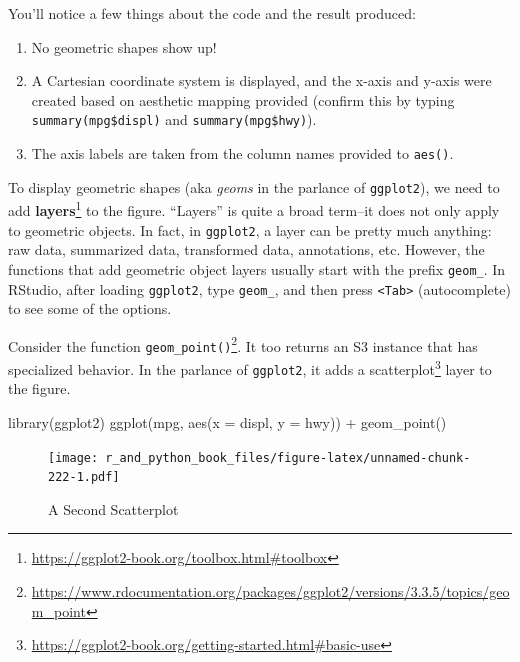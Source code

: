 \documentclass[
  12pt,
  krantz2]{krantz}
\makeatletter
\newenvironment{Shaded}{\begin{snugshade}}{\end{snugshade}}
\newcommand{\AttributeTok}[1]{\textcolor[rgb]{0.61,0.61,0.61}{#1}}
\newcommand{\FunctionTok}[1]{\textcolor[rgb]{0,0,0}{#1}}
\newcommand{\NormalTok}[1]{#1}
\newcommand{\SpecialCharTok}[1]{\textcolor[rgb]{0,0,0}{#1}}
\renewcommand{\href}[2]{#2\footnote{\url{#1}}}
\newenvironment{kframe}{%
\medskip{}
\setlength{\fboxsep}{.8em}
 \def\at@end@of@kframe{}%
 \ifinner\ifhmode%
  \def\at@end@of@kframe{\end{minipage}}%
  \begin{minipage}{\columnwidth}%
 \fi\fi%
 \def\FrameCommand##1{\hskip\@totalleftmargin \hskip-\fboxsep
 \colorbox{shadecolor}{##1}\hskip-\fboxsep
     \hskip-\linewidth \hskip-\@totalleftmargin \hskip\columnwidth}%
 \MakeFramed {\advance\hsize-\width
   \@totalleftmargin\z@ \linewidth\hsize
   \@setminipage}}%
 {\par\unskip\endMakeFramed%
 \at@end@of@kframe}
\renewenvironment{Shaded}{\begin{kframe}}{\end{kframe}}
\makeatother
\begin{document}
You'll notice a few things about the code and the result produced:

\begin{enumerate}
\def\labelenumi{\arabic{enumi}.}
\item
  No geometric shapes show up!
\item
  A Cartesian coordinate system is displayed, and the x-axis and y-axis were created based on aesthetic mapping provided (confirm this by typing \texttt{summary(mpg\$displ)} and \texttt{summary(mpg\$hwy)}).
\item
  The axis labels are taken from the column names provided to \texttt{aes()}.
\end{enumerate}

To display geometric shapes (aka \emph{geoms} in the parlance of \texttt{ggplot2}), we need to add \href{https://ggplot2-book.org/toolbox.html\#toolbox}{\textbf{layers}} to the figure. ``Layers'' is quite a broad term--it does not only apply to geometric objects. In fact, in \texttt{ggplot2}, a layer can be pretty much anything: raw data, summarized data, transformed data, annotations, etc. However, the functions that add geometric object layers usually start with the prefix \texttt{geom\_}. In RStudio, after loading \texttt{ggplot2}, type \texttt{geom\_}, and then press \texttt{\textless{}Tab\textgreater{}} (autocomplete) to see some of the options.

Consider the function \href{https://www.rdocumentation.org/packages/ggplot2/versions/3.3.5/topics/geom_point}{\texttt{geom\_point()}}. It too returns an S3 instance that has specialized behavior. In the parlance of \texttt{ggplot2}, it adds a \href{https://ggplot2-book.org/getting-started.html\#basic-use}{scatterplot} layer to the figure.

\begin{Shaded}
\begin{Highlighting}[]
\FunctionTok{library}\NormalTok{(ggplot2)}
\FunctionTok{ggplot}\NormalTok{(mpg, }\FunctionTok{aes}\NormalTok{(}\AttributeTok{x =}\NormalTok{ displ, }\AttributeTok{y =}\NormalTok{ hwy))  }\SpecialCharTok{+}
  \FunctionTok{geom\_point}\NormalTok{()}
\end{Highlighting}
\end{Shaded}

\begin{figure}
\centering
\texttt{[image: r\_and\_python\_book\_files/figure-latex/unnamed-chunk-222-1.pdf]}
\caption{\label{fig:unnamed-chunk-222}A Second Scatterplot}
\end{figure}
\end{document}
